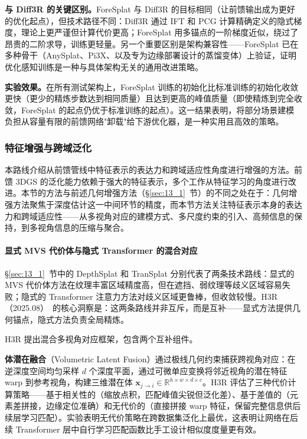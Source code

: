 \textbf{与 Diff3R 的关键区别。}ForeSplat 与 Diff3R 的目标相同（让前馈输出成为更好的优化起点），但技术路径不同：Diff3R 通过 IFT 和 PCG 计算精确定义的隐式梯度，理论上更严谨但计算代价更高；ForeSplat 用多锚点的一阶梯度近似，绕过了昂贵的二阶求导，训练更轻量。另一个重要区别是架构兼容性——ForeSplat 已在多种骨干（AnySplat、Pi3X、以及专为边缘部署设计的蒸馏变体）上验证，证明优化感知训练是一种与具体架构无关的通用改进策略。

\textbf{实验效果。}在所有测试架构上，ForeSplat 训练的初始化比标准训练的初始化收敛更快（更少的精炼步数达到相同质量）且达到更高的峰值质量（即使精炼到完全收敛，ForeSplat 的起点仍优于标准训练的起点）。这一结果表明，将部分场景建模负担从容量有限的前馈网络"卸载"给下游优化器，是一种实用且高效的策略。

\subsubsection{特征增强与跨域泛化}
\label{sec:13_1_5}

本路线介绍从前馈管线中特征表示的表达力和跨域适应性角度进行增强的方法。前馈 3DGS 的泛化能力依赖于强大的特征表示，多个工作从特征学习的角度进行改进。本节的方法与前述几何增强方法（\S\ref{sec:13_1}~节）的不同之处在于：几何增强方法聚焦于深度估计这一中间环节的精度，而本节方法关注特征表示本身的表达力和跨域适应性——从多视角对应的建模方式、多尺度约束的引入、高频信息的保持，到多视角信息的压缩与聚合。

\paragraph{显式 MVS 代价体与隐式 Transformer 的混合对应}

\S\ref{sec:13_1}~节中的 DepthSplat 和 TranSplat 分别代表了两条技术路线：显式的 MVS 代价体方法在纹理丰富区域精度高，但在遮挡、弱纹理等歧义区域容易失败；隐式的 Transformer 注意力方法对歧义区域更鲁棒，但收敛较慢。H3R（2025.08）~\cite{2508_03118}的核心洞察是：这两条路线并非互斥，而是互补——显式方法提供几何锚点，隐式方法负责全局精炼。

H3R 提出混合多视角对应框架，包含两个互补组件。

\textbf{体潜在融合}（Volumetric Latent Fusion）通过极线几何约束捕获跨视角对应：在逆深度空间均匀采样 $d$ 个深度平面，通过可微单应变换将邻近视角的潜在特征 warp 到参考视角，构建三维潜在体 $\bm{x}_{j \to i} \in \mathbb{R}^{h \times w \times d \times c}$。H3R 评估了三种代价计算策略——基于相关性的（缩放点积，匹配峰值尖锐但泛化差）、基于差值的（元素差拼接，边缘定位准确）和无代价的（直接拼接 warp 特征，保留完整信息供后续层学习匹配）。实验表明无代价策略在跨数据集泛化上最优，这表明让网络在后续 Transformer 层中自行学习匹配函数比手工设计相似度度量更有效。


